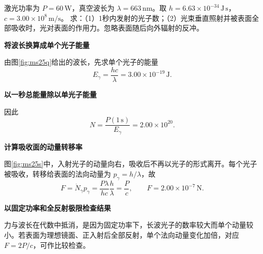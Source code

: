 \begin{question}
\begin{example}[激光光子数与辐射压力]\label{sup:m25}
激光功率为 \(P=60\,\mathrm W\)，真空波长为 \(\lambda=663\,\mathrm{nm}\)。取 \(h=6.63\times10^{-34}\,\mathrm{J\,s}\)，\(c=3.00\times10^8\,\mathrm{m/s}\)。
求：（1）1秒内发射的光子数；（2）光束垂直照射并被表面全部吸收时，光对表面的作用力。忽略表面随后向外辐射的反冲。
\end{example}
\end{question}

\begin{solution}\textbf{将波长换算成单个光子能量}\par\nobreak
由图\ref{fig:ms25q}给出的波长，先求单个光子的能量
\[
 E_\gamma=\frac{hc}{\lambda}
 =3.00\times10^{-19}\,\mathrm J.
\]


\par\medskip{}\noindent\textbf{以一秒总能量除以单光子能量}\par\nobreak
因此
\[
 \boxed{N=\frac{P(1\,\mathrm s)}{E_\gamma}
 =2.00\times10^{20}}.
\]


\par\medskip{}\noindent\textbf{计算吸收面的动量转移率}\par\nobreak
图\ref{fig:ms25s}中，入射光子的动量向右，吸收后不再以光子的形式离开。每个光子被吸收，转移给表面的法向动量为 \(p_\gamma=h/\lambda\)，故
\[
 F=\dot N_\gamma p_\gamma
 =\frac{P\lambda}{hc}\frac h\lambda
 =\frac Pc,\qquad
 \boxed{F=2.00\times10^{-7}\,\mathrm N}.
\]


\par\medskip{}\noindent\textbf{以固定功率和全反射极限检查结果}\par\nobreak
力与波长在代数中抵消，是因为固定功率下，长波光子的数率较大而单个动量较小。若表面为理想镜面、正入射后全部反射，单个法向动量变化加倍，对应 \(F=2P/c\)，可作比较检查。
\end{solution}

